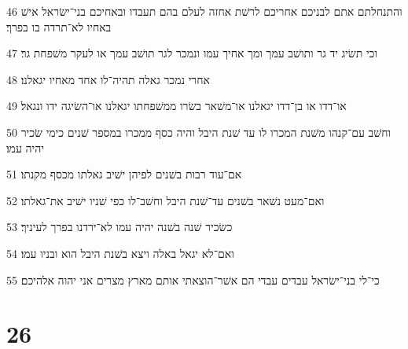 \par 46 והתנחלתם אתם לבניכם אחריכם לרשׁת אחזה לעלם בהם תעבדו ובאחיכם בני־ישׂראל אישׁ באחיו לא־תרדה בו בפרך׃
\par 47 וכי תשׂיג יד גר ותושׁב עמך ומך אחיך עמו ונמכר לגר תושׁב עמך או לעקר משׁפחת גר׃
\par 48 אחרי נמכר גאלה תהיה־לו אחד מאחיו יגאלנו׃
\par 49 או־דדו או בן־דדו יגאלנו או־משׁאר בשׂרו ממשׁפחתו יגאלנו או־השׂיגה ידו ונגאל׃
\par 50 וחשׁב עם־קנהו משׁנת המכרו לו עד שׁנת היבל והיה כסף ממכרו במספר שׁנים כימי שׂכיר יהיה עמו׃
\par 51 אם־עוד רבות בשׁנים לפיהן ישׁיב גאלתו מכסף מקנתו׃
\par 52 ואם־מעט נשׁאר בשׁנים עד־שׁנת היבל וחשׁב־לו כפי שׁניו ישׁיב את־גאלתו׃
\par 53 כשׂכיר שׁנה בשׁנה יהיה עמו לא־ירדנו בפרך לעיניך׃
\par 54 ואם־לא יגאל באלה ויצא בשׁנת היבל הוא ובניו עמו׃
\par 55 כי־לי בני־ישׂראל עבדים עבדי הם אשׁר־הוצאתי אותם מארץ מצרים אני יהוה אלהיכם׃

\chapter{26}

